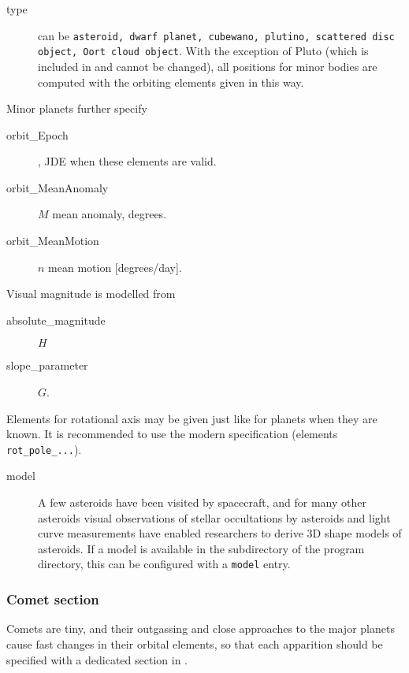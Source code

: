 \begin{description}
\item[type] can be \texttt{asteroid, dwarf planet, cubewano,
  plutino, scattered disc object, Oort cloud object}. With the
exception of Pluto (which is included in  and cannot be changed), 
all positions for minor bodies are computed with the orbiting elements given in this way. 
\end{description}

Minor planets further specify
\begin{description}
\item[orbit\_Epoch], JDE when these elements are valid.
\item[orbit\_MeanAnomaly] $M$ mean anomaly, degrees. 
\item[orbit\_MeanMotion] $n$ mean motion [degrees/day].
\end{description}

Visual magnitude is modelled from
\begin{description}
\item[absolute\_magnitude] $H$
\item[slope\_parameter] $G$.
\end{description}

Elements for rotational axis may be given just like for planets when
they are known. It is recommended to use the modern specification
(elements \texttt{rot\_pole\_...}).

\begin{description}
\item[model]
A few asteroids have been visited by spacecraft, 
and for many other asteroids visual observations of stellar occultations 
by asteroids and light curve measurements have enabled researchers to derive 
3D shape models of asteroids. If a model is available in the  
subdirectory of the program directory, this can be configured with a \texttt{model} entry.
\end{description}


\subsubsection{Comet section}
\label{sec:ssystem.ini:Comet}

Comets are tiny, and their outgassing and close approaches to the
major planets cause fast changes in their orbital elements, so that
each apparition should be specified with a dedicated section in
.

